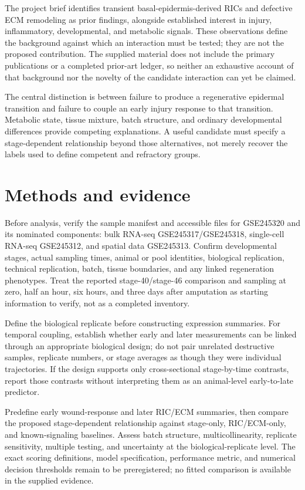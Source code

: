 \documentclass[11pt]{article}
\begin{document}
The project brief identifies transient basal-epidermis-derived RICs and defective ECM remodeling as prior findings, alongside established interest in injury, inflammatory, developmental, and metabolic signals. These observations define the background against which an interaction must be tested; they are not the proposed contribution. The supplied material does not include the primary publications or a completed prior-art ledger, so neither an exhaustive account of that background nor the novelty of the candidate interaction can yet be claimed.

The central distinction is between failure to produce a regenerative epidermal transition and failure to couple an early injury response to that transition. Metabolic state, tissue mixture, batch structure, and ordinary developmental differences provide competing explanations. A useful candidate must specify a stage-dependent relationship beyond those alternatives, not merely recover the labels used to define competent and refractory groups.

\section{Methods and evidence}
Before analysis, verify the sample manifest and accessible files for GSE245320 and its nominated components: bulk RNA-seq GSE245317/GSE245318, single-cell RNA-seq GSE245312, and spatial data GSE245313. Confirm developmental stages, actual sampling times, animal or pool identities, biological replication, technical replication, batch, tissue boundaries, and any linked regeneration phenotypes. Treat the reported stage-40/stage-46 comparison and sampling at zero, half an hour, six hours, and three days after amputation as starting information to verify, not as a completed inventory.

Define the biological replicate before constructing expression summaries. For temporal coupling, establish whether early and later measurements can be linked through an appropriate biological design; do not pair unrelated destructive samples, replicate numbers, or stage averages as though they were individual trajectories. If the design supports only cross-sectional stage-by-time contrasts, report those contrasts without interpreting them as an animal-level early-to-late predictor.

Predefine early wound-response and later RIC/ECM summaries, then compare the proposed stage-dependent relationship against stage-only, RIC/ECM-only, and known-signaling baselines. Assess batch structure, multicollinearity, replicate sensitivity, multiple testing, and uncertainty at the biological-replicate level. The exact scoring definitions, model specification, performance metric, and numerical decision thresholds remain to be preregistered; no fitted comparison is available in the supplied evidence.
\end{document}

